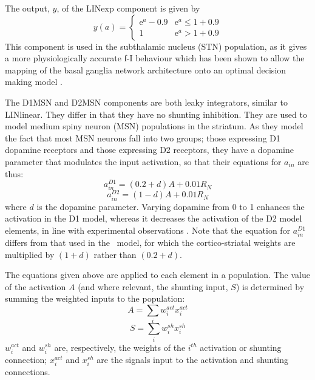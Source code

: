 \documentclass{frontiersSCNS}
\begin{document}
The output, $y$, of the LINexp component is given by
\begin{equation}
   y(a) = \begin{cases}
      \mathrm{e}^{a}-0.9   & \mathrm{e}^a \leq 1+0.9 \\
      1   & \mathrm{e}^a > 1+0.9
   \end{cases}
\end{equation}
This component is used in the subthalamic nucleus (STN) population, as
it gives a more physiologically accurate f-I
behaviour
\citep{wilson_model_2004,bevan_mechanisms_1999,hallworth_apamin-sensitive_2003}
which has been shown to allow the mapping of the basal ganglia network
architecture onto an optimal decision making
model \citep{bogacz_basal_2007}.

The D1MSN and D2MSN components are both leaky integrators, similar to
LINlinear. They differ in that they have no shunting inhibition. They
are used to model medium spiny neuron (MSN) populations in the
striatum. As they model the fact that most MSN neurons fall into two
groups; those expressing D1 dopamine receptors and those expressing D2
receptors, they have a dopamine parameter that modulates the input
activation, so that their equations for $a_{in}$ are thus:
\begin{equation}
   a_{in}^{D1} = (0.2 + d)A + 0.01 R_N
\end{equation}
\begin{equation}
   a_{in}^{D2} = (1 - d)A + 0.01 R_N
\end{equation}
where $d$ is the dopamine parameter. Varying dopamine from 0 to 1
enhances the activation in the D1 model, whereas it decreases the
activation of the D2 model elements, in line with experimental
observations \citep{harsing_influence_1997,gonon_prolonged_1997}.
Note that the equation for $a_{in}^{D1}$ differs from that used in
the \ccg~model, for which the cortico-striatal weights are multiplied
by $(1+d)$ rather than $(0.2+d)$.

The equations given above are applied to each element in a
population. The value of the activation $A$ (and where relevant, the
shunting input, $S$) is determined by summing the weighted inputs to
the population:
\begin{equation}
A = \sum_{i}w_i^{act} x_i^{act}
\end{equation}
\begin{equation}
S = \sum_{i}w_i^{sh} x_i^{sh}
\end{equation}
$w_i^{act}$ and $w_i^{sh}$ are, respectively, the weights of the
$i^{th}$ activation or shunting connection; $x_i^{act}$ and $x_i^{sh}$
are the signals input to the activation and shunting connections.
\end{document}
